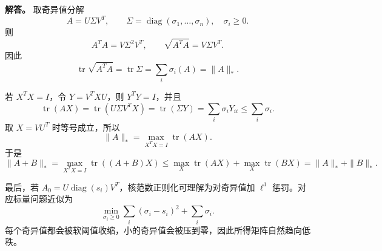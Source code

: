 ﻿\documentclass[UTF8,12pt]{ctexart}
\begin{document}
\begin{enumerate}[label=\textbf{\arabic*.},leftmargin=2.2em]
\textbf{解答。} 取奇异值分解
\[
A=U\Sigma V^T,
\qquad
\Sigma=\operatorname{diag}(\sigma_1,
\ldots,\sigma_n),
\quad \sigma_i\ge0.
\]
则
\[
A^TA=V\Sigma^2V^T,
\qquad
\sqrt{A^TA}=V\Sigma V^T.
\]
因此
\[
\operatorname{tr}\sqrt{A^TA}=\operatorname{tr}\Sigma
=\sum_i\sigma_i(A)=\|A\|_*.
\]

若 \(X^TX=I\)，令 \(Y=V^TXU\)，则 \(Y^TY=I\)，并且
\[
\operatorname{tr}(AX)=\operatorname{tr}(U\Sigma V^TX)
=\operatorname{tr}(\Sigma Y)
=\sum_i\sigma_iY_{ii}
\le\sum_i\sigma_i.
\]
取 \(X=VU^T\) 时等号成立，所以
\[
\|A\|_*=
\max_{X^TX=I}\operatorname{tr}(AX).
\]
于是
\[
\|A+B\|_*
=\max_{X^TX=I}\operatorname{tr}((A+B)X)
\le \max_X\operatorname{tr}(AX)+\max_X\operatorname{tr}(BX)
=\|A\|_*+\|B\|_*.
\]

最后，若 \(A_0=U\operatorname{diag}(s_i)V^T\)，核范数正则化可理解为对奇异值加 \(\ell^1\) 惩罚。对应标量问题近似为
\[
\min_{\sigma_i\ge0}\sum_i(\sigma_i-s_i)^2+\sum_i\sigma_i.
\]
每个奇异值都会被软阈值收缩，小的奇异值会被压到零，因此所得矩阵自然趋向低秩。
\end{enumerate}
\end{document}
